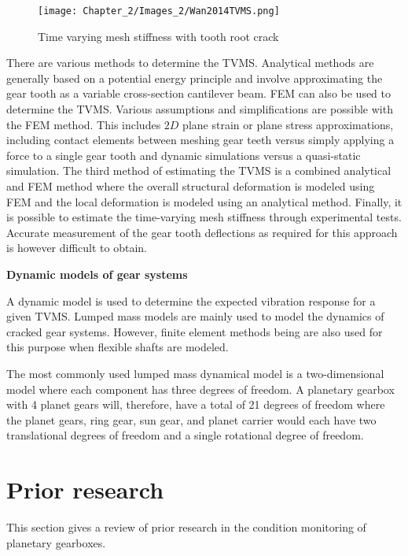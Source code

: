 \begin{figure}[H]
	\centering
	\texttt{[image: Chapter\_2/Images\_2/Wan2014TVMS.png]}
	\caption{Time varying mesh stiffness with tooth root crack \citep{Wan2014}}
	\label{F:Wan2014}
\end{figure}



There are various methods to determine the TVMS. Analytical methods are generally based on a potential energy principle and involve approximating the gear tooth as a variable cross-section cantilever beam. FEM can also be used to determine the TVMS. Various assumptions and simplifications are possible with the FEM method. This includes $2D$ plane strain or plane stress approximations, including contact elements between meshing gear teeth versus simply applying a force to a single gear tooth and dynamic simulations versus a quasi-static simulation. The third method of estimating the TVMS is a combined analytical and FEM method where the overall structural deformation is modeled using FEM and the local deformation is modeled using an analytical method. Finally, it is possible to estimate the time-varying mesh stiffness through experimental tests. Accurate measurement of the gear tooth deflections as required for this approach is however difficult to obtain. 




\textbf{Dynamic models of gear systems}

A dynamic model is used to determine the expected vibration response for a given TVMS. Lumped mass models are mainly used to model the dynamics of cracked gear systems. However, finite element methods being are also used for this purpose when flexible shafts are modeled. 

The most commonly used lumped mass dynamical model is a two-dimensional model where each component has three degrees of freedom. A planetary gearbox with 4 planet gears will, therefore, have a total of 21 degrees of freedom where the planet gears, ring gear, sun gear, and planet carrier would each have two translational degrees of freedom and a single rotational degree of freedom. 



\section{Prior research}
This section gives a review of prior research in the condition monitoring of planetary gearboxes.

